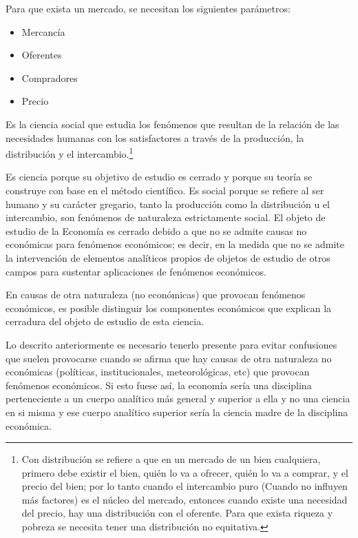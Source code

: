 Para que exista un mercado, se necesitan los siguientes parámetros:
\begin{itemize}
    \item Mercancía
    \item Oferentes
    \item Compradores
    \item Precio    
\end{itemize}
\begin{definition}[Economía]
    Es la ciencia social que estudia los fenómenos que resultan de la relación de las necesidades humanas con los satisfactores a través de la producción, la distribución y el intercambio.\footnote{Con distribución se refiere a que en un mercado de un bien cualquiera, primero debe existir el bien, quién lo va a ofrecer, quién lo va a comprar, y el precio del bien; por lo tanto cuando el intercambio puro (Cuando no influyen más factores) es el núcleo del mercado, entonces cuando existe una necesidad del precio, hay una distribución con el oferente. Para que exista riqueza y pobreza se necesita tener una distribución no equitativa.}
\end{definition}
Es ciencia porque su objetivo de estudio es cerrado y porque su teoría se construye con base en el método científico. Es social porque se refiere al ser humano y su carácter gregario, tanto la producción como la distribución u el intercambio, son fenómenos de naturaleza estrictamente social.
El objeto de estudio de la Economía es cerrado debido a que no se admite causas no económicas para fenómenos económicos; es decir, en la medida que no se admite la intervención de elementos analíticos propios de objetos de estudio de otros campos para sustentar aplicaciones de fenómenos económicos.

En causas de otra naturaleza (no económicas) que provocan fenómenos económicos, es posible distinguir los componentes económicos que explican la cerradura del objeto de estudio de esta ciencia.


Lo descrito anteriormente es necesario tenerlo presente para evitar confusiones que suelen provocarse cuando se afirma que hay causas de otra naturaleza no económicas (políticas, institucionales, meteorológicas, etc) que provocan fenómenos económicos. Si esto fuese así, la economía sería una disciplina perteneciente a un cuerpo analítico más general y superior a ella y no una ciencia en si misma y ese cuerpo analítico superior sería la ciencia madre de la disciplina económica.

